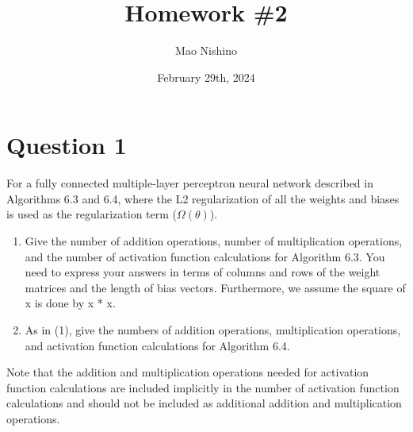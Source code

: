 \documentclass[
	12pt, %
]{../Template/fphw}
\title{Homework \#2} %
\author{Mao Nishino} %
\date{February 29th, 2024} %
\institute{Florida State University \\ Department of Computer Science} %
\begin{document}
\maketitle %


\section*{Question 1}

\begin{problem}
 For a fully connected multiple-layer perceptron neural network described in Algorithms 6.3 and
6.4, where the L2 regularization of all the weights and biases is used as the regularization term ($\Omega(\theta)$).
\begin{enumerate}[label=(\arabic*)]
    \item Give the number of addition operations, number of multiplication operations, and the number of activation
function calculations for Algorithm 6.3. You need to express your answers in terms of columns and rows of the
weight matrices and the length of bias vectors. Furthermore, we assume the square of x is done by x * x.
    \item As in (1), give the numbers of addition operations, multiplication operations, and activation function calculations for Algorithm 6.4.
\end{enumerate}
Note that the addition and multiplication operations needed for activation function calculations are included implicitly
in the number of activation function calculations and should not be included as additional addition and multiplication
operations.
\end{problem}

\end{document}
